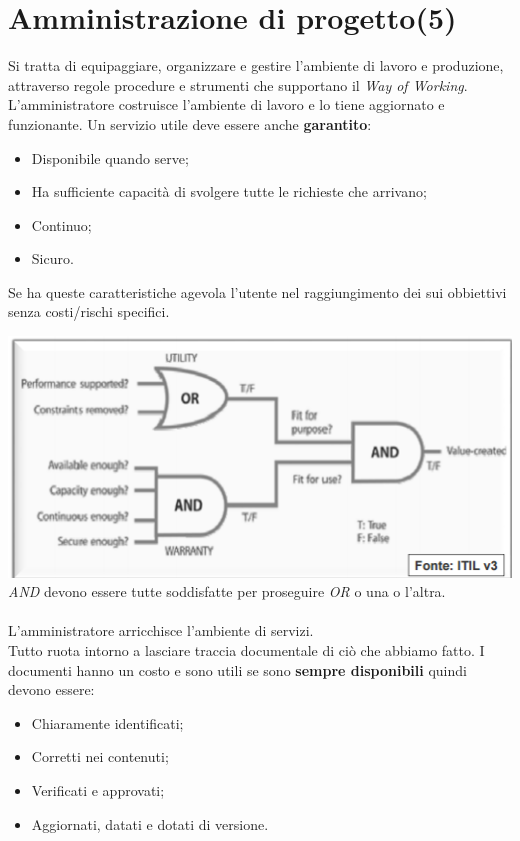 


\section{Amministrazione di progetto(5)}

Si tratta di equipaggiare, organizzare e gestire l'ambiente di lavoro e produzione, attraverso regole procedure e strumenti che supportano il \textit{Way of Working}.
L'amministratore costruisce l'ambiente di lavoro e lo tiene aggiornato e funzionante. Un servizio utile deve essere anche \textbf{garantito}:

\begin{itemize}

	\item Disponibile quando serve;
	\item Ha sufficiente capacità di svolgere tutte le richieste che arrivano;
	\item Continuo;
	\item Sicuro.

\end{itemize}
Se ha queste caratteristiche agevola l'utente nel raggiungimento dei sui obbiettivi senza costi/rischi specifici.

\includegraphics[width=0.75\columnwidth]{img10}\\
\textit{AND} devono essere tutte soddisfatte per proseguire \textit{OR} o una o l'altra.
\\
\\
L'amministratore arricchisce l'ambiente di servizi.\\ Tutto ruota intorno a lasciare traccia documentale di ciò che abbiamo fatto. I documenti hanno un costo e sono utili se sono \textbf{sempre disponibili} quindi devono essere:
\begin{itemize}
	\item Chiaramente identificati;
	\item Corretti nei contenuti;
	\item Verificati e approvati;
	\item Aggiornati, datati e dotati di versione.
\end{itemize}

